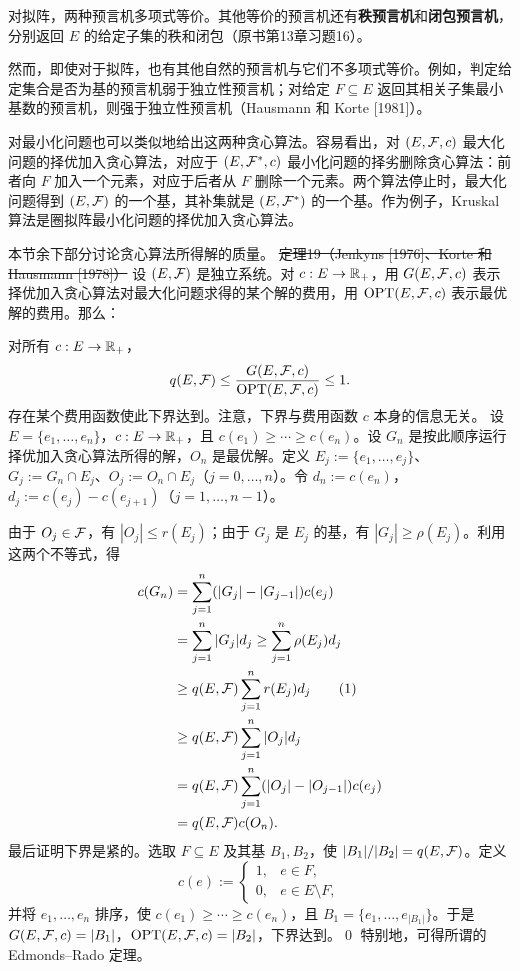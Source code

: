 \begin{tcolorbox}[breakable,colframe=red!85!black,colback=white,boxrule=1.3pt,arc=0pt,left=7pt,right=7pt,top=7pt,bottom=7pt,before skip=10pt,after skip=10pt]
对拟阵，两种预言机多项式等价。其他等价的预言机还有\textbf{秩预言机}和\textbf{闭包预言机}，分别返回 $E$ 的给定子集的秩和闭包（原书第13章习题16）。

然而，即使对于拟阵，也有其他自然的预言机与它们不多项式等价。例如，判定给定集合是否为基的预言机弱于独立性预言机；对给定 $F\subseteq E$ 返回其相关子集最小基数的预言机，则强于独立性预言机（Hausmann 和 Korte [1981]）。
\end{tcolorbox}

对最小化问题也可以类似地给出这两种贪心算法。容易看出，对 $(E,\mathcal F,c)$ 最大化问题的择优加入贪心算法，对应于 $(E,\mathcal F^*,c)$ 最小化问题的择劣删除贪心算法：前者向 $F$ 加入一个元素，对应于后者从 $F$ 删除一个元素。两个算法停止时，最大化问题得到 $(E,\mathcal F)$ 的一个基，其补集就是 $(E,\mathcal F^*)$ 的一个基。作为例子，Kruskal 算法是圈拟阵最小化问题的择优加入贪心算法。

本节余下部分讨论贪心算法所得解的质量。
\st{定理19（Jenkyns [1976]、Korte 和 Hausmann [1978]）} 设 $(E,\mathcal F)$ 是独立系统。对 $c:E\to\mathbb R_+$，用 $G(E,\mathcal F,c)$ 表示择优加入贪心算法对最大化问题求得的某个解的费用，用 $\operatorname{OPT}(E,\mathcal F,c)$ 表示最优解的费用。那么：

对所有 $c:E\to\mathbb R_+$，
\[q(E,\mathcal F)\le\frac{G(E,\mathcal F,c)}{\operatorname{OPT}(E,\mathcal F,c)}\le1.\]
存在某个费用函数使此下界达到。注意，下界与费用函数 $c$ 本身的信息无关。
\pr 设 $E=\{e_1,\ldots,e_n\}$，$c:E\to\mathbb R_+$，且 $c(e_1)\ge\cdots\ge c(e_n)$。设 $G_n$ 是按此顺序运行择优加入贪心算法所得的解，$O_n$ 是最优解。定义 $E_j:=\{e_1,\ldots,e_j\}$、$G_j:=G_n\cap E_j$、$O_j:=O_n\cap E_j$（$j=0,\ldots,n$）。令 $d_n:=c(e_n)$，$d_j:=c(e_j)-c(e_{j+1})$（$j=1,\ldots,n-1$）。

由于 $O_j\in\mathcal F$，有 $|O_j|\le r(E_j)$；由于 $G_j$ 是 $E_j$ 的基，有 $|G_j|\ge\rho(E_j)$。利用这两个不等式，得
\begin{align}
c(G_n)&=\sum_{j=1}^n(|G_j|-|G_{j-1}|)c(e_j)\notag\\
&=\sum_{j=1}^n|G_j|d_j\ge\sum_{j=1}^n\rho(E_j)d_j\notag\\
&\ge q(E,\mathcal F)\sum_{j=1}^nr(E_j)d_j\tag{1}\\
&\ge q(E,\mathcal F)\sum_{j=1}^n|O_j|d_j\notag\\
&=q(E,\mathcal F)\sum_{j=1}^n(|O_j|-|O_{j-1}|)c(e_j)\notag\\
&=q(E,\mathcal F)c(O_n).\notag
\end{align}
最后证明下界是紧的。选取 $F\subseteq E$ 及其基 $B_1,B_2$，使 $|B_1|/|B_2|=q(E,\mathcal F)$。定义
\[c(e):=\begin{cases}1,&e\in F,\\0,&e\in E\setminus F,\end{cases}\]
并将 $e_1,\ldots,e_n$ 排序，使 $c(e_1)\ge\cdots\ge c(e_n)$，且 $B_1=\{e_1,\ldots,e_{|B_1|}\}$。于是 $G(E,\mathcal F,c)=|B_1|$，$\operatorname{OPT}(E,\mathcal F,c)=|B_2|$，下界达到。\qed
特别地，可得所谓的 Edmonds--Rado 定理。

